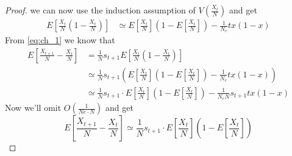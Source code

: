 \documentclass[12pt]{extarticle}
\begin{document}
\begin{proof}
we can now use the induction assumption of $V(\frac{X_t}{N})$ and get
\begin{equation}
\begin{split}
E\left[\frac{X_t}{N}\left(1-\frac{X_t}{N}\right)\right] &\simeq
E\left[\frac{X_t}{N}\right]\left(1-E\left[\frac{X_t}{N}\right]\right)-\frac{1}{N_e}tx(1-x)
\end{split}
\end{equation}
From \cref{eq:ch_1} we know that
\begin{equation}
\begin{split}
E\left[\frac{X_{t+1}}{N}-\frac{X_t}{N}\right] &= \frac{1}{N}s_{t+1}E\left[\frac{X_t}{N}\left(1-\frac{X_t}{N}\right)\right] \\
&\simeq \frac{1}{N}s_{t+1}\left(E\left[\frac{X_t}{N}\right]\left(1-E\left[\frac{X_t}{N}\right]\right) - \frac{1}{N_e}tx(1-x)\right) \\
&\simeq \frac{1}{N}s_{t+1}\cdot E\left[\frac{X_t}{N}\right]\left(1-E\left[\frac{X_t}{N}\right]\right) - \frac{1}{N_e N}s_{t+1}tx(1-x)
\end{split}
\end{equation}
Now we'll omit $O(\frac{1}{Ne\cdot N})$ and get
\begin{equation}\label{eq:ch_2}
E\left[\frac{X_{t+1}}{N}-\frac{X_t}{N}\right] \simeq \frac{1}{N}s_{t+1}\cdot E\left[\frac{X_t}{N}\right]\left(1-E\left[\frac{X_t}{N}\right]\right)
\end{equation}


\end{proof}
\end{document}
